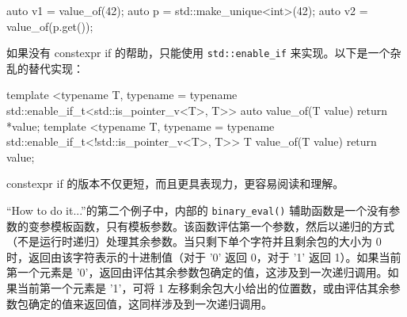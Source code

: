 \begin{cpp}
auto v1 = value_of(42);
auto p = std::make_unique<int>(42);
auto v2 = value_of(p.get());
\end{cpp}

如果没有 constexpr if 的帮助，只能使用 \verb|std::enable_if| 来实现。以下是一个杂乱的替代实现：

\begin{cpp}
template <typename T,
          typename = typename std::enable_if_t<std::is_pointer_v<T>, T>>
auto value_of(T value)
{
    return *value;
}
template <typename T,
          typename = typename std::enable_if_t<!std::is_pointer_v<T>, T>>
T value_of(T value)
{
    return value;
}
\end{cpp}

constexpr if 的版本不仅更短，而且更具表现力，更容易阅读和理解。

“How to do it...”的第二个例子中，内部的 \verb|binary_eval()| 辅助函数是一个没有参数的变参模板函数，只有模板参数。该函数评估第一个参数，然后以递归的方式（不是运行时递归）处理其余参数。当只剩下单个字符并且剩余包的大小为 0 时，返回由该字符表示的十进制值（对于 '0' 返回 0，对于 '1' 返回 1）。如果当前第一个元素是 '0'，返回由评估其余参数包确定的值，这涉及到一次递归调用。如果当前第一个元素是 '1'，可将 1 左移剩余包大小给出的位置数，或由评估其余参数包确定的值来返回值，这同样涉及到一次递归调用。






